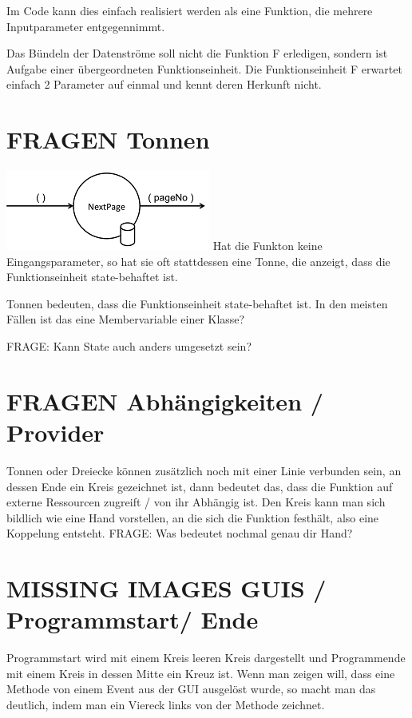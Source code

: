 \documentclass[a4paper,12pt,oneside]{book}
\begin{document}
Im Code kann dies einfach realisiert werden als eine Funktion, die mehrere Inputparameter entgegennimmt.

Das Bündeln der Datenströme soll nicht die Funktion F erledigen, sondern ist Aufgabe einer übergeordneten Funktionseinheit.
Die Funktionseinheit F erwartet einfach 2 Parameter auf einmal und kennt deren Herkunft nicht.

\section{FRAGEN Tonnen}
\label{sec-3-9}

\includegraphics[width=.9\linewidth]{./img/diagramTonne.png}
Hat die Funkton keine Eingangsparameter, so hat sie oft stattdessen eine Tonne, die anzeigt, dass die Funktionseinheit state-behaftet ist.

Tonnen bedeuten, dass die Funktionseinheit state-behaftet ist.
In den meisten Fällen ist das eine Membervariable einer Klasse?

FRAGE: Kann State auch anders umgesetzt sein?
\section{FRAGEN Abhängigkeiten / Provider}
\label{sec-3-10}

Tonnen oder Dreiecke können zusätzlich noch mit einer Linie verbunden sein, an dessen Ende ein Kreis gezeichnet ist,
dann bedeutet das, dass die Funktion auf externe Ressourcen zugreift / von ihr
Abhängig ist.
Den Kreis kann man sich bildlich wie eine Hand vorstellen, an die sich die
Funktion festhält, also eine Koppelung entsteht.
FRAGE: Was bedeutet nochmal genau dir Hand?

\section{MISSING IMAGES GUIS / Programmstart/ Ende}
\label{sec-3-11}
Programmstart wird mit einem Kreis leeren Kreis dargestellt und Programmende mit
einem Kreis in dessen Mitte ein Kreuz ist.
Wenn man zeigen will, dass eine Methode von einem Event aus der GUI ausgelöst
wurde, so macht man das deutlich, indem man ein Viereck links von der Methode zeichnet.
\end{document}
